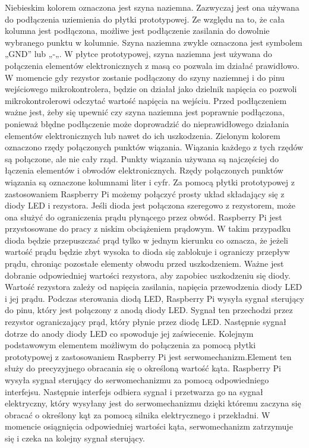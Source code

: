 Niebieskim kolorem oznaczona jest szyna naziemna. Zazwyczaj jest ona używana do podłączenia uziemienia do płytki prototypowej. Ze względu na to, że cała kolumna jest podłączona, możliwe jest podłączenie zasilania do dowolnie wybranego punktu w kolumnie. Szyna naziemna zwykle oznaczona jest symbolem „GND” lub „-„. W płytce prototypowej, szyna naziemna jest używana do połączenia elementów elektronicznych z masą co pozwala im działać prawidłowo. W momencie gdy rezystor zostanie podłączony do szyny naziemnej i do pinu wejściowego mikrokontrolera, będzie on działał jako dzielnik napięcia co pozwoli mikrokontrolerowi odczytać wartość napięcia na wejściu. Przed podłączeniem ważne jest, żeby się upewnić czy szyna naziemna jest poprawnie podłączona, ponieważ błędne podłączenie może doprowadzić do nieprawidłowego działania elementów elektronicznych lub nawet do ich uszkodzenia.
Zielonym kolorem oznaczono rzędy połączonych punktów wiązania. Wiązania każdego z tych rzędów są połączone, ale nie cały rząd. Punkty wiązania używana są najczęściej do łączenia elementów i obwodów elektronicznych. Rzędy połączonych punktów wiązania są oznaczone kolumnami liter i cyfr.
Za pomocą płytki prototypowej z zastosowaniem Raspberry Pi możemy połączyć prosty układ składający się z diody LED i rezystora. Jeśli dioda jest połączona szeregowo z rezystorem, może ona służyć do ograniczenia prądu płynącego przez obwód. Raspberry Pi jest przystosowane do pracy z niskim obciążeniem prądowym. W takim przypadku dioda będzie przepuszczać prąd tylko w jednym kierunku co oznacza, że jeżeli wartość prądu będzie zbyt wysoka to dioda się zablokuje i ograniczy przepływ prądu, chroniąc pozostałe elementy obwodu przed uszkodzeniem. Ważne jest dobranie odpowiedniej wartości rezystora, aby zapobiec uszkodzeniu się diody. Wartość rezystora zależy od napięcia zasilania, napięcia przewodzenia diody LED i jej prądu. Podczas sterowania diodą LED, Raspberry Pi wysyła sygnał sterujący do pinu, który jest połączony z anodą diody LED. Sygnał ten przechodzi przez rezystor ograniczający prąd, który płynie przez diodę LED. Następnie sygnał dotrze do anody diody LED co spowoduje jej zaświecenie.
Kolejnym podstawowym elementem możliwym do połączenia za pomocą płytki prototypowej z zastosowaniem Raspberry Pi jest serwomechanizm.Element ten służy do precyzyjnego obracania się o określoną wartość kąta. Raspberry Pi wysyła sygnał sterujący do serwomechanizmu za pomocą odpowiedniego interfejsu. Następnie interfejs odbiera sygnał i przetwarza go na sygnał elektryczny, który wysyłany jest do serwomechanizmu dzięki któremu zaczyna się obracać o określony kąt za pomocą silnika elektrycznego i przekładni. W momencie osiągnięcia odpowiedniej wartości kąta, serwomechanizm zatrzymuje się i czeka na kolejny sygnał sterujący.
